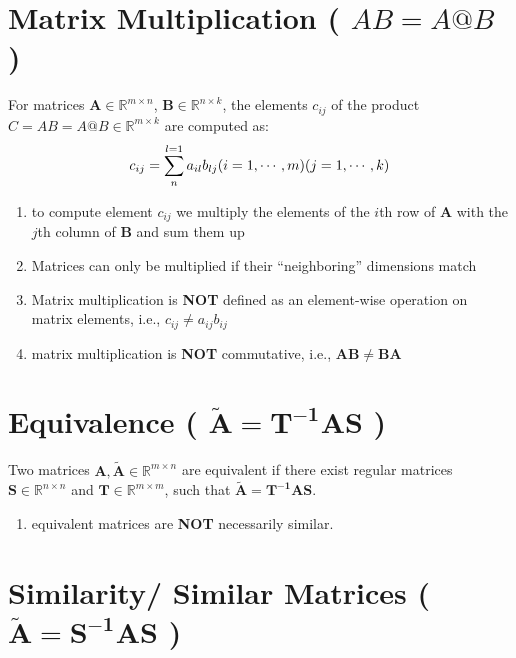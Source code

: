 \section{Matrix Multiplication ( $AB = A@B$ ) \cite{mfml-1}}
For matrices $\mathbf{A} \in \mathbb{R}^{m\times n}$, $\mathbf{B} \in \mathbb{R}^{n\times k}$, the elements $c_{ij}$ of the product $C = AB = A@B \in \mathbb{R}^{m\times k}$ are computed as:
\[
    \displaystyle
    c_{ij} = \sum_{n}^{l=1} a_{il}b_{lj}
    \hfill
    (i=1,\cdots,m)(j=1,\cdots,k)
\]

\begin{enumerate}
    \item to compute element $c_{ij}$ we multiply the elements of the $i$th row of $\mathbf{A}$ with the $j$th column of $\mathbf{B}$ and sum them up

    \item Matrices can only be multiplied if their “neighboring” dimensions match

    \item Matrix multiplication is \textbf{NOT} defined as an element-wise operation on matrix elements, i.e., $c_{ij} \neq a_{ij}b_{ij}$

    \item matrix multiplication is \textbf{NOT} commutative, i.e., $\mathbf{AB \neq BA}$
\end{enumerate}


\section{Equivalence ( $\mathbf{\tilde{A} = T^{-1}AS}$ ) \cite{mfml-1}}\label{Equivalence}

Two matrices $\mathbf{A, \tilde{A}} \in \mathbb{R}^{m\times n}$ are equivalent if there exist regular matrices $\mathbf{S} \in \mathbb{R}^{n\times n}$ and $\mathbf{T} \in \mathbb{R}^{m\times m}$, such that $\mathbf{\tilde{A} = T^{-1}AS}$.

\begin{enumerate}
    \item equivalent matrices are \textbf{NOT} necessarily similar.
\end{enumerate}


\section{Similarity/ Similar Matrices ( $\mathbf{\tilde{A} = S^{-1}AS}$ ) \cite{mfml-1}}\label{Similarity/ Similar Matrices}

